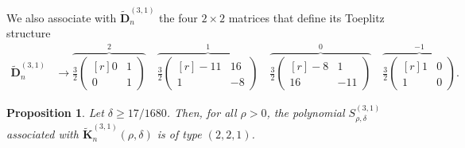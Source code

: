 \documentclass[addpoints,12pt,letter]{article}
\newcommand{\de}{\delta}
\newcommand{\SR}{S}
\renewcommand{\ge}{\geqslant}
\numberwithin{equation}{section}
\newtheorem{proposition}[lemma]{Proposition}
\theoremstyle{definition}
\begin{document}
We also associate with $\widetilde{\mathbf{D}}_{n}^{(3,1)}$ the four $2\times 2$ matrices that define its Toeplitz structure
\begin{align}\label{eq:425}
\widetilde{\mathbf{D}}_{n}^{(3,1)} &\to
\overbrace{\frac{3}{2}\begin{pmatrix}[r]
0 & 1
\\ 0 & 1
\end{pmatrix}}^{2}
\quad
\overbrace{\frac{3}{2}\begin{pmatrix}[r]
-11 & 16
\\ 1 &-8
\end{pmatrix}}^{1}
\quad
\overbrace{\frac{3}{2}\begin{pmatrix}[r]
-8 & 1
\\ 16 &-11
\end{pmatrix}}^{0}
\quad
\overbrace{\frac{3}{2}\begin{pmatrix}[r]
1 & 0
\\ 1 & 0
\end{pmatrix}}^{-1}.
\end{align}

\begin{proposition} \label{prop:59}
Let $\de\ge 17/1680$.
Then, for all $\rho>0$, the polynomial $\SR_{\rho,\de}^{(3,1)}$ associated with $\widetilde{\mathbf{K}}_{n}^{(3,1)}(\rho,\delta)$ is of type $(2,2,1)$.
\end{proposition}
\end{document}
